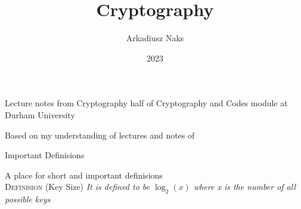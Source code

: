 \documentclass[12pt, letterpaper]{article}
\title{Cryptography}
\author{Arkadiusz Naks}
\date{2023}
\begin{document}
\begin{titlepage}
  \begin{center}
    \makeatletter
    \vspace*{1cm}
    \Huge
    \textbf{\@title}

    \vspace{0.5cm}
    \Large
    Lecture notes from Cryptography half of Cryptography and Codes module at Durham University

    \vspace{1.5cm}

    \textbf{\@author}

    \vfill

    \vspace{0.8cm}

    \small
    Based on my understanding of lectures and notes of \\
    \@date{}
  \end{center}
\end{titlepage}

\tableofcontents
\newpage

\begin{section}{Important Definisions}

  A place for short and important definisions \\

  \textsc{Definision} (Key Size) \textit{It is defined to be \(\log_{2}(x)\)
    where x is the number of all possible keys}

\end{section}
\end{document}
